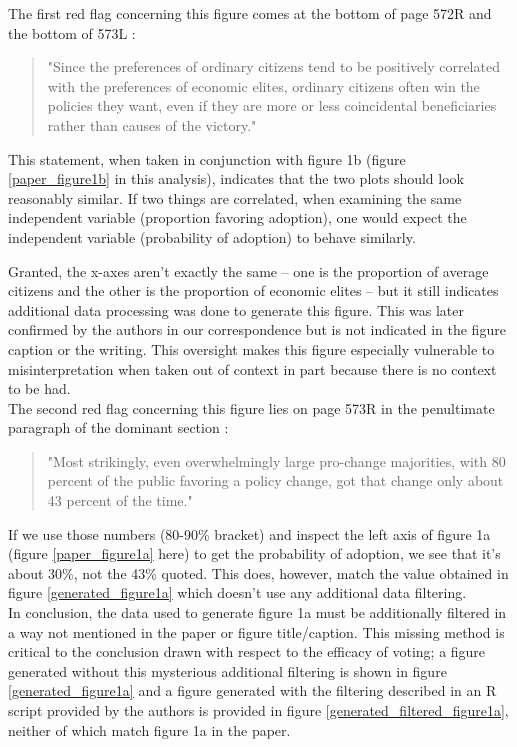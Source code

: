 \documentclass[]{article}
\begin{document}
The first red flag concerning this figure comes at the bottom of page 572R and the bottom of 573L \cite{gilens}:
\begin{quotation}
	"Since the preferences of ordinary citizens tend to be positively correlated with the preferences of economic elites, ordinary citizens often win the policies they want, even if they are more or less coincidental beneficiaries rather than causes of the victory."
\end{quotation}
This statement, when taken in conjunction with figure 1b (figure \ref{paper_figure1b} in this analysis), indicates that the two plots should look reasonably similar.
If two things are correlated, when examining the same independent variable (proportion favoring adoption), one would expect the independent variable (probability of adoption) to behave similarly.

Granted, the x-axes aren't exactly the same -- one is the proportion of average citizens and the other is the proportion of economic elites -- but it still indicates additional data processing was done to generate this figure. This was later confirmed by the authors in our correspondence but is not indicated in the figure caption or the writing.
This oversight makes this figure especially vulnerable to misinterpretation when taken out of context in part because there is no context to be had.\\

The second red flag concerning this figure lies on page 573R in the penultimate paragraph of the dominant section \cite{gilens}:
\begin{quotation}
	\label{43_percent}
	"Most strikingly, even overwhelmingly large pro-change majorities, with 80 percent of the public favoring a policy change, got that change only about 43 percent of the time."
\end{quotation}
If we use those numbers (80-90\% bracket) and inspect the left axis of figure 1a (figure \ref{paper_figure1a} here) to get the probability of adoption, we see that it's about 30\%, not the 43\% quoted.
This does, however, match the value obtained in figure \ref{generated_figure1a} which doesn't use any additional data filtering.\\

In conclusion, the data used to generate figure 1a must be additionally filtered in a way not mentioned in the paper or figure title/caption. 
This missing method is critical to the conclusion drawn with respect to the efficacy of voting; a figure generated without this mysterious additional filtering is shown in figure \ref{generated_figure1a} and a figure generated with the filtering described in an R script provided by the authors is provided in figure \ref{generated_filtered_figure1a}, neither of which match figure 1a in the paper.
\end{document}
